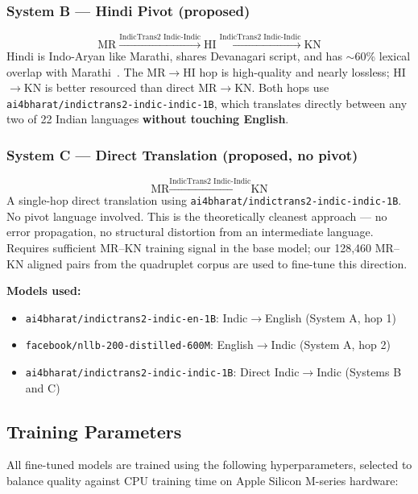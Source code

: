 \documentclass[conference,letterpaper]{IEEEtran}
\begin{document}
\subsubsection{System B — Hindi Pivot (proposed)}
\begin{equation}
\text{MR} \xrightarrow{\text{IndicTrans2 Indic-Indic}} \text{HI}
\xrightarrow{\text{IndicTrans2 Indic-Indic}} \text{KN}
\end{equation}
Hindi is Indo-Aryan like Marathi, shares Devanagari script, and has
$\sim$60\% lexical overlap with Marathi~\cite{masica1991indoaryan}.
The MR$\rightarrow$HI hop is high-quality and nearly lossless;
HI$\rightarrow$KN is better resourced than direct MR$\rightarrow$KN.
Both hops use \texttt{ai4bharat/indictrans2-indic-indic-1B},
which translates directly between any two of 22 Indian languages
\textbf{without touching English}.

\subsubsection{System C — Direct Translation (proposed, no pivot)}
\begin{equation}
\text{MR} \xrightarrow{\text{IndicTrans2 Indic-Indic}} \text{KN}
\end{equation}
A single-hop direct translation using
\texttt{ai4bharat/indictrans2-indic-indic-1B}.
No pivot language involved. This is the theoretically cleanest
approach — no error propagation, no structural distortion from an
intermediate language. Requires sufficient MR--KN training signal
in the base model; our 128,460 MR--KN aligned pairs from the
quadruplet corpus are used to fine-tune this direction.

\noindent\textbf{Models used:}
\begin{itemize}
    \item \texttt{ai4bharat/indictrans2-indic-en-1B}: Indic$\rightarrow$English
    (System A, hop 1)~\cite{gala2023indictrans2}
    \item \texttt{facebook/nllb-200-distilled-600M}: English$\rightarrow$Indic
    (System A, hop 2)~\cite{nllb2022}
    \item \texttt{ai4bharat/indictrans2-indic-indic-1B}: Direct Indic$\rightarrow$Indic
    (Systems B and C)~\cite{gala2023indictrans2}
\end{itemize}

\subsection{Training Parameters}
All fine-tuned models are trained using the following hyperparameters,
selected to balance quality against CPU training time on Apple Silicon
M-series hardware:
\end{document}

